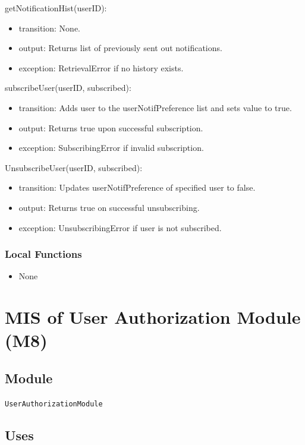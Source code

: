 \documentclass[12pt, titlepage]{article}
\begin{document}
\noindent getNotificationHist(userID):
\begin{itemize}
\item transition: None.
\item output: Returns list of previously sent out notifications.
\item exception: RetrievalError if no history exists.
\end{itemize}

\noindent subscribeUser(userID, subscribed):
\begin{itemize}
\item transition: Adds user to the userNotifPreference list and sets value to true.
\item output: Returns true upon successful subscription.
\item exception: SubscribingError if invalid subscription.
\end{itemize}

\noindent UnsubscribeUser(userID, subscribed):
\begin{itemize}
\item transition: Updates userNotifPreference of specified user to false.
\item output: Returns true on successful unsubscribing.
\item exception: UnsubscribingError if user is not subscribed.
\end{itemize}

\subsubsection{Local Functions}
\begin{itemize}
\item None
\end{itemize}

\section{MIS of User Authorization Module (M8)} \label{MIS_M8}

\subsection{Module}

\texttt{UserAuthorizationModule}\\

\subsection{Uses}
\end{document}
